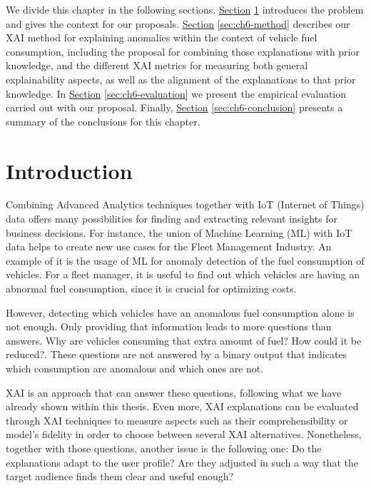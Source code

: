 We divide this chapter in the following sections. \hyperref[sec:ch6-IntroFleet]{Section} \ref{sec:ch6-IntroFleet} introduces the problem and gives the context for our proposals. \hyperref[sec:ch6-method]{Section} \ref{sec:ch6-method} describes our XAI method for explaining anomalies within the context of vehicle fuel consumption, including the proposal for combining those explanations with prior knowledge, and the different XAI metrics for measuring both general explainability aspects, as well as the alignment of the explanations to that prior knowledge. In \hyperref[sec:ch6-evaluation]{Section} \ref{sec:ch6-evaluation} we present the empirical evaluation carried out with our proposal. Finally, \hyperref[sec:ch6-conclusion]{Section} \ref{sec:ch6-conclusion} presents a summary of the conclusions for this chapter.


\section{Introduction}\label{sec:ch6-IntroFleet}
Combining Advanced Analytics techniques together with IoT (Internet of Things) data offers many possibilities for finding and extracting relevant insights for business decisions. For instance, the union of Machine Learning (ML) with IoT data helps to create new use cases for the Fleet Management Industry. An example of it is the usage of ML for anomaly detection of the fuel consumption of vehicles. For a fleet manager, it is useful to find out which vehicles are having an abnormal fuel consumption, since it is crucial for optimizing costs.

However, detecting which vehicles have an anomalous fuel consumption alone is not enough. Only providing that information leads to more questions than answers. Why are vehicles consuming that extra amount of fuel? How could it be reduced?. These questions are not answered by a binary output that indicates which consumption are anomalous and which ones are not.

XAI is an approach that can answer these questions, following what we have already shown within this thesis. Even more, XAI explanations can be evaluated through XAI techniques to measure aspects such as their comprehensibility or model's fidelity in order to choose between several XAI alternatives. Nonetheless, together with those questions, another issue is the following one: Do the explanations adapt to the user profile? Are they adjusted in such a way that the target audience finds them clear and useful enough?


